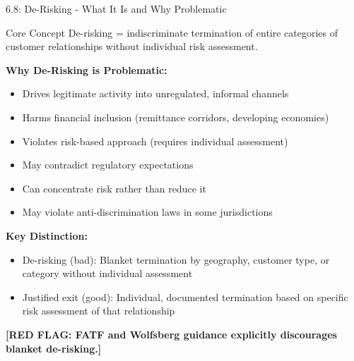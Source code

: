 \documentclass[11pt,a4paper]{beamer}
\newcommand{\redflag}[1]{\textcolor{red!80!black}{\textbf{[RED FLAG: #1]}}}
\begin{document}

\begin{frame}{6.8: De-Risking - What It Is and Why Problematic}
	\begin{block}{Core Concept}
		De-risking = indiscriminate termination of entire categories of customer relationships without individual risk assessment.
	\end{block}
	\textbf{Why De-Risking is Problematic:}
	\begin{itemize}
		\item Drives legitimate activity into unregulated, informal channels
		\item Harms financial inclusion (remittance corridors, developing economies)
		\item Violates risk-based approach (requires individual assessment)
		\item May contradict regulatory expectations
		\item Can concentrate risk rather than reduce it
		\item May violate anti-discrimination laws in some jurisdictions
	\end{itemize}
	\textbf{Key Distinction:}
	\begin{itemize}
		\item De-risking (bad): Blanket termination by geography, customer type, or category without individual assessment
		\item Justified exit (good): Individual, documented termination based on specific risk assessment of that relationship
	\end{itemize}
	\redflag{FATF and Wolfsberg guidance explicitly discourages blanket de-risking.}
\end{frame}
\end{document}
